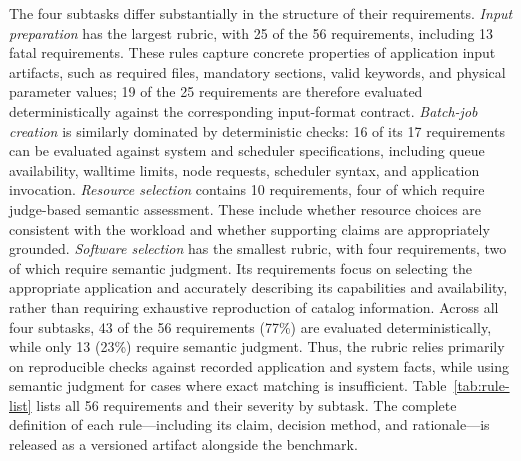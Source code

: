 \documentclass[conference]{IEEEtran}
\begin{document}
The four subtasks differ substantially in the structure of their requirements. \emph{Input preparation} has the largest rubric, with 25 of the 56 requirements, including 13 fatal requirements. These rules capture concrete properties of application input artifacts, such as required files, mandatory sections, valid keywords, and physical parameter values; 19 of the 25 requirements are therefore evaluated deterministically against the corresponding input-format contract. \emph{Batch-job creation} is similarly dominated by deterministic checks: 16 of its 17 requirements can be evaluated against system and scheduler specifications, including queue availability, walltime limits, node requests, scheduler syntax, and application invocation.
\emph{Resource selection} contains 10 requirements, four of which require judge-based semantic assessment. These include whether resource choices are consistent with the workload and whether supporting claims are appropriately grounded. \emph{Software selection} has the smallest rubric, with four requirements, two of which require semantic judgment. Its requirements focus on selecting the appropriate application and accurately describing its capabilities and availability, rather than requiring exhaustive reproduction of catalog information.
Across all four subtasks, 43 of the 56 requirements (77\%) are evaluated deterministically, while only 13 (23\%) require semantic judgment. Thus, the rubric relies primarily on reproducible checks against recorded application and system facts, while using semantic judgment for cases where exact matching is insufficient. Table~\ref{tab:rule-list} lists all 56 requirements and their severity by subtask. The complete definition of each rule---including its claim, decision method, and rationale---is released as a versioned artifact alongside the benchmark.
\end{document}
